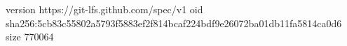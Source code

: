 version https://git-lfs.github.com/spec/v1
oid sha256:5cb83c55802a5793f5883ef2f814bcaf224bdf9e26072ba01db11fa5814ca0d6
size 770064
